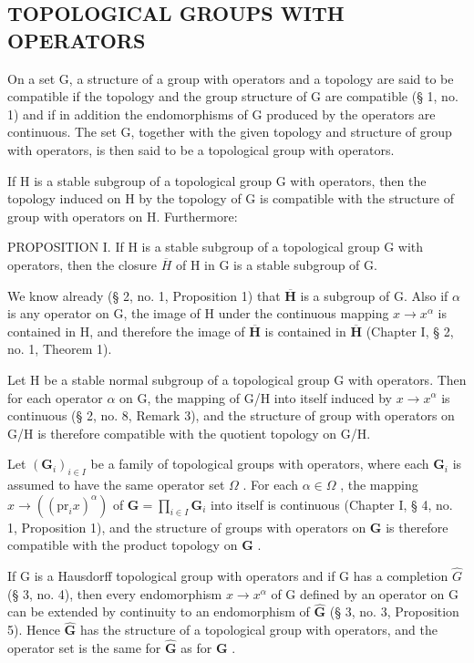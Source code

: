 \subsection{TOPOLOGICAL GROUPS WITH OPERATORS}

On a set G, a structure of a group with operators and a topology are said to be compatible if the topology and the group structure of G are compatible (§ 1, no. 1) and if in addition the endomorphisms of G produced by the operators are continuous. The set G, together with the given topology and structure of group with operators, is then said to be a topological group with operators.

If H is a stable subgroup of a topological group G with operators, then the topology induced on H by the topology of G is compatible with the structure of group with operators on H. Furthermore:

PROPOSITION I. If H is a stable subgroup of a topological group G with operators, then the closure \(\overline{H}\) of H in G is a stable subgroup of G.

We know already (§ 2, no. 1, Proposition 1) that \(\overline{\mathbf{H}}\) is a subgroup of G. Also if \(\alpha\) is any operator on G, the image of H under the continuous mapping \(x \to x^{\alpha}\) is contained in H, and therefore the image of \(\overline{\mathbf{H}}\) is contained in \(\overline{\mathbf{H}}\) (Chapter I, § 2, no. 1, Theorem 1).

Let H be a stable normal subgroup of a topological group G with operators. Then for each operator \(\alpha\) on G, the mapping of G/H into itself induced by \(x \rightarrow x^{\alpha}\) is continuous (§ 2, no. 8, Remark 3), and the structure of group with operators on G/H is therefore compatible with the quotient topology on G/H.

Let \((\mathbf{G}_i)_{i\in I}\) be a family of topological groups with operators, where each \(\mathbf{G}_i\) is assumed to have the same operator set \(\Omega\) . For each \(\alpha \in \Omega\) , the mapping \(x\to ((\mathrm{pr}_i x)^{\alpha})\) of \(\mathbf{G} = \prod_{i\in I}\mathbf{G}_i\) into itself is continuous (Chapter I, § 4, no. 1, Proposition 1), and the structure of groups with operators on \(\mathbf{G}\) is therefore compatible with the product topology on \(\mathbf{G}\) .

If G is a Hausdorff topological group with operators and if G has a completion \(\hat{G}\) (§ 3, no. 4), then every endomorphism \(x \to x^{\alpha}\) of G defined by an operator on G can be extended by continuity to an endomorphism of \(\hat{\mathbf{G}}\) (§ 3, no. 3, Proposition 5). Hence \(\hat{\mathbf{G}}\) has the structure of a topological group with operators, and the operator set is the same for \(\hat{\mathbf{G}}\) as for \(\mathbf{G}\) .

